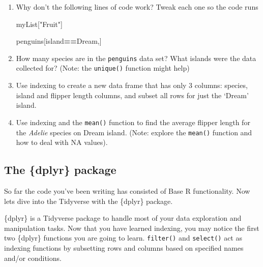 \documentclass[
]{book}
\newenvironment{Shaded}{\begin{snugshade}}{\end{snugshade}}
\newcommand{\NormalTok}[1]{#1}
\newcommand{\SpecialCharTok}[1]{\textcolor[rgb]{0.81,0.36,0.00}{\textbf{#1}}}
\newcommand{\StringTok}[1]{\textcolor[rgb]{0.31,0.60,0.02}{#1}}
\begin{document}
\begin{enumerate}
\def\labelenumi{\arabic{enumi}.}
\item
  Why don't the following lines of code work? Tweak each one so the code runs

\begin{Shaded}
\begin{Highlighting}[]
\NormalTok{myList[}\StringTok{"Fruit"}\NormalTok{]}
\end{Highlighting}
\end{Shaded}

\begin{Shaded}
\end{Shaded}

\begin{Shaded}
\begin{Highlighting}[]
\NormalTok{penguins[island}\SpecialCharTok{==}\StringTok{\textquotesingle{}Dream\textquotesingle{}}\NormalTok{,]}
\end{Highlighting}
\end{Shaded}
\item
  How many species are in the \texttt{penguins} data set? What islands were the data collected for? (Note: the \texttt{unique()} function might help)
\item
  Use indexing to create a new data frame that has only 3 columns: species, island and flipper length columns, and subset all rows for just the `Dream' island.
\item
  Use indexing and the \texttt{mean()} function to find the average flipper length for the \emph{Adelie} species on Dream island. (Note: explore the \texttt{mean()} function and how to deal with NA values).
\end{enumerate}

\hypertarget{the-dplyr-package}{%
\subsection{The \{dplyr\} package}\label{the-dplyr-package}}

So far the code you've been writing has consisted of Base R functionality. Now lets dive into the Tidyverse with the \{dplyr\} package.

\{dplyr\} is a Tidyverse package to handle most of your data exploration and manipulation tasks. Now that you have learned indexing, you may notice the first two \{dplyr\} functions you are going to learn. \texttt{filter()} and \texttt{select()} act as indexing functions by subsetting rows and columns based on specified names and/or conditions.
\end{document}
